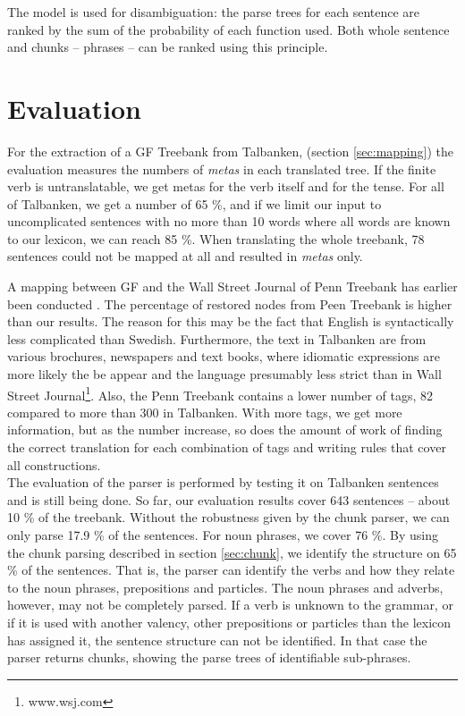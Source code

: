 \documentclass[runningheads,a4paper]{llncs}
\begin{document}
The model is used for disambiguation: the parse trees for each sentence
are ranked by the sum of the probability of each function used.
Both whole sentence and chunks -- phrases -- can be ranked using this
principle.


\section{Evaluation}

For the extraction of a GF Treebank from Talbanken, (section \ref{sec:mapping})
the evaluation measures the numbers of \textit{metas} in each translated tree.
If the finite verb is untranslatable, we get metas for the verb itself and for the
tense.
For all of Talbanken, we get a number of 65 \%, and if we limit our input to
uncomplicated sentences with no more than 10 words where all words are known to
our lexicon, we can reach 85 \%. When translating the whole treebank, 78 sentences
could not be mapped at all and resulted in \textit{metas} only.

A mapping between GF and the Wall Street Journal of Penn Treebank has earlier been conducted \cite{gfMech}.
The percentage of restored nodes from Peen Treebank is higher than our results.
The reason for this may be the fact that English is syntactically less complicated
than Swedish.
Furthermore, the text in Talbanken are from various brochures, newspapers and text books,
where idiomatic expressions are more likely the be appear and the language
presumably less strict than in Wall Street Journal\footnote{www.wsj.com}.
Also, the Penn Treebank contains a lower number of tags, 82 compared
to more than 300 in Talbanken. With more tags, we get more information, but as the number 
increase, so does the amount of work of finding the correct translation 
for each combination of tags and writing rules that cover all constructions. \\

The evaluation of the parser is performed by testing it on Talbanken sentences
and is still being done. So far, our evaluation results cover 643 sentences -- about 10 \%
of the treebank. Without the robustness given by the chunk parser,
we can only parse 17.9 \% of the sentences. For noun phrases, we cover 76 \%.
By using the chunk parsing described in section
\ref{sec:chunk}, we identify the structure on 65 \% of the sentences. That
is, the parser can identify the verbs and how they relate to the noun phrases,
prepositions and particles. The noun phrases and adverbs, however, may not be
completely parsed. If a verb is unknown to the grammar, or if it is used with
another valency, other prepositions or particles than the lexicon has assigned
it, the sentence structure can not be identified. In that case
the parser returns chunks, showing the parse trees of identifiable sub-phrases.
\end{document}
